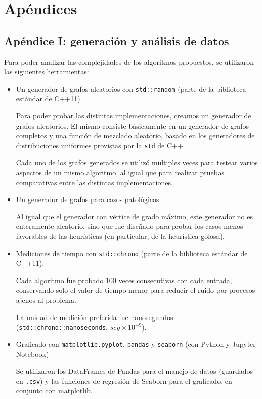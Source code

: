 \section{Apéndices}
	\subsection{Apéndice I: generación y análisis de datos}

	Para poder analizar las complejidades de los algoritmos propuestos, se utilizaron las siguientes herramientas:

	\begin{itemize}
		\item Un generador de grafos aleatorios con \texttt{std::random} (parte de la biblioteca estándar de C++11).

		Para poder probar las distintas implementaciones, creamos un generador de grafos aleatorios. El mismo consiste básicamente en un generador de grafos completos y una función de mezclado aleatorio, basado en los generadores de distribuciones uniformes provistas por la \texttt{std} de C++.

		Cada uno de los grafos generados se utilizó multiples veces para testear varios aspectos de un mismo algoritmo, al igual que para realizar pruebas comparativas entre las distintas implementaciones.

		\item Un generador de grafos para casos patológicos

		Al igual que el generador con vértice de grado máximo, este generador no es enteramente aleatorio, sino que fue diseñado para probar los casos menos favorables de las heurísticas (en particular, de la heurística golosa).

		\item Mediciones de tiempo con \texttt{std::chrono} (parte de la biblioteca estándar de C++11).

		Cada algoritmo fue probado 100 veces consecutivas con cada entrada, conservando solo el valor de tiempo menor para reducir el ruido por procesos ajenos al problema.

		La unidad de medición preferida fue nanosegundos (\texttt{std::chrono::nanoseconds}, $seg \times 10^{-9}$).

		\item Graficado con \texttt{matplotlib.pyplot}, \texttt{pandas} y \texttt{seaborn} (con Python y Jupyter Notebook)

		Se utilizaron los DataFrames de Pandas para el manejo de datos (guardados en \texttt{.csv}) y las funciones de regresión de Seaborn para el graficado, en conjunto con matplotlib.

	\end{itemize}

